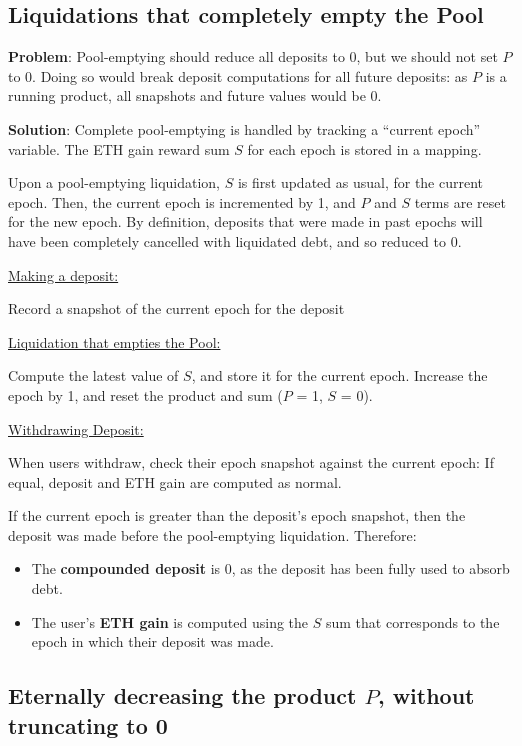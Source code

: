 \documentclass[reqno]{article}
\begin{document}
\bigskip
\subsection{Liquidations that completely empty the Pool}

\bigskip
\textbf{Problem}: Pool-emptying should reduce all deposits to 0, but we should not set {$P$} to 0. Doing so would break deposit computations for all future deposits: as {$P$} is a running product, all snapshots and future values would be 0.

\bigskip
\textbf{Solution}: Complete pool-emptying is handled by tracking a “current epoch” variable. The ETH gain reward sum {$S$} for each epoch is stored in a mapping.

\bigskip
Upon a pool-emptying liquidation, {$S$} is first updated as usual, for the current epoch. Then, the current epoch is incremented by 1, and {$P$} and {$S$} terms are reset for the new epoch. By definition, deposits that were made in past epochs will have been completely cancelled with liquidated debt, and so reduced to 0.

\bigskip
\underline{Making a deposit:}

Record a snapshot of the current epoch for the deposit

\bigskip
\underline{Liquidation that empties the Pool:}

Compute the latest value of {$S$}, and store it for the current epoch.
Increase the epoch by 1, and reset the product and sum ({$P$} = 1, {$S$} = 0).

\bigskip
\underline{Withdrawing Deposit:}

When users withdraw, check their epoch snapshot against the current epoch: If equal, deposit and ETH gain are computed as normal.

\bigskip
If the current epoch is greater than the deposit’s epoch snapshot, then the deposit was made before the pool-emptying liquidation. Therefore:
\begin{itemize}
    \item The \textbf{compounded deposit} is 0, as the deposit has been fully used to absorb debt.
    \item The user’s \textbf{ETH gain} is computed using the $S$ sum that corresponds to the epoch in which their deposit was made.
\end{itemize}

\bigskip
\subsection{Eternally decreasing the product $P$, without truncating to 0}
\end{document}
